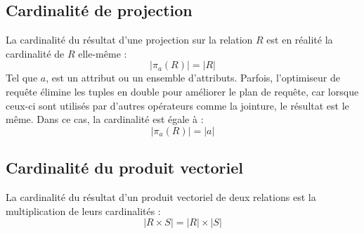 \subsection{Cardinalité de projection}
La cardinalité du résultat d'une projection sur la relation $R$ est en réalité la cardinalité de $R$ elle-même :
\begin{equation}
 |\pi_a(R)| = |R|
\end{equation}
Tel que $a$, est un attribut ou un ensemble d'attributs. Parfois, l'optimiseur de requête élimine les tuples en double pour améliorer le plan de requête, car lorsque ceux-ci sont utilisés par d'autres opérateurs comme la jointure, le résultat est le même. Dans ce cas, la cardinalité est égale à :
\begin{equation}
 |\pi_a(R)| = |a|
\end{equation}

\subsection{Cardinalité du produit vectoriel}
La cardinalité du résultat d'un produit vectoriel de deux relations est la multiplication de leurs cardinalités :
\begin{equation}
 |R \times S| = |R| \times |S|
\end{equation}

